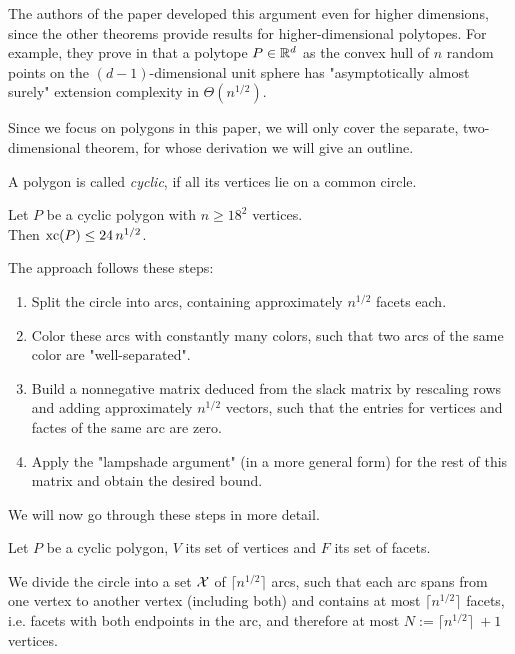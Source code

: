 The authors of the paper developed this argument even for higher dimensions, since the other theorems provide results for higher-dimensional polytopes. For example, they prove in \cite[Theorem 1.1]{shitov2020sublinear} that a polytope $P \in \mathbb{R}^d$ as the convex hull of $n$ random points on the $(d-1)$-dimensional unit sphere has "asymptotically almost surely" extension complexity in $\Theta(n^{1/2})$.

Since we focus on polygons in this paper, we will only cover the separate, two-dimensional theorem, for whose derivation we will give an outline.

\begin{definition}
  A polygon is called \emph{cyclic}, if all its vertices lie on a common circle.
\end{definition}

\begin{theorem}\label{theorem:cyclic-xc}
  Let $P$ be a cyclic polygon with $n \geq 18^2$ vertices.\\
  Then $\operatorname{xc}(P) \leq 24\,n^{1/2}$.
\end{theorem}

The approach follows these steps:

\begin{enumerate}
  \item Split the circle into arcs, containing approximately $n^{1/2}$ facets each.
  \item Color these arcs with constantly many colors, such that two arcs of the same color are "well-separated".
  \item Build a nonnegative matrix deduced from the slack matrix by rescaling rows and adding approximately $n^{1/2}$ vectors, such that the entries for vertices and factes of the same arc are zero.
  \item Apply the "lampshade argument" (in a more general form) for the rest of this matrix and obtain the desired bound.
\end{enumerate}

We will now go through these steps in more detail.

Let $P$ be a cyclic polygon, $V$ its set of vertices and $F$ its set of facets.

We divide the circle into a set $\mathcal{X}$ of $\lceil n^{1/2} \rceil$ arcs, such that each arc spans from one vertex to another vertex (including both) and contains at most $\lceil n^{1/2} \rceil$ facets, i.e. facets with both endpoints in the arc, and therefore at most $N := \lceil n^{1/2} \rceil\ + 1$ vertices.


